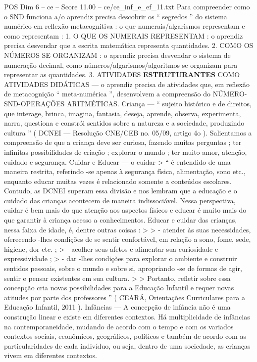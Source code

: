 \begin{textsample}{POS Dim 6 – ce – Score 11.00 – ce/ce\_inf\_e\_ef\_11.txt}
Para compreender como o SND funciona a/o aprendiz precisa descobrir os “ segredos ” do sistema numérico em reflexão metacognitiva : o que numerais/algarismos representam e como representam : 1.
O QUE OS NUMERAIS REPRESENTAM : o aprendiz precisa desvendar que a escrita matemática representa quantidades. 2.
COMO OS NÚMEROS SE ORGANIZAM : o aprendiz precisa desvendar o sistema de numeração decimal, como números/algarismos/algoritmos se organizam para representar as quantidades. 3.
ATIVIDADES \textbf{ESTRUTURANTES} COMO ATIVIDADES DIDÁTICAS — o aprendiz precisa de atividades que, em reflexão de metacognição “ meta-numérica ”, desenvolvem a compreensão do NÚMERO-SND-OPERAÇÕES ARITMÉTICAS.
Criança — “ sujeito histórico e de direitos, que interage, brinca, imagina, fantasia, deseja, aprende, observa, experimenta, narra, questiona e constrói sentidos sobre a natureza e a sociedade, produzindo cultura ” ( DCNEI — Resolução CNE/CEB no. 05/09, artigo 4o ).
Salientamos a compreensão de que a criança deve ser curiosa, fazendo muitas perguntas ; ter infinitas possibilidades de criação ; explorar o mundo ; ter muito amor, atenção, cuidado e segurança.
Cuidar e Educar — o cuidar > “ é entendido de uma maneira restrita, referindo -se apenas à segurança física, alimentação, sono etc., enquanto educar muitas vezes é relacionado somente a conteúdos escolares.
Contudo, as DCNEI superam essa divisão e nos lembram que a educação e o cuidado das crianças acontecem de maneira indissociável.
Nessa perspectiva, cuidar é bem mais do que atenção aos aspectos físicos e educar é muito mais do que garantir à criança acesso a conhecimentos.
Educar e cuidar das crianças, nessa faixa de idade, é, dentre outras coisas : > > - atender às suas necessidades, oferecendo -lhes condições de se sentir confortável, em relação a sono, fome, sede, higiene, dor etc. ; > - acolher seus afetos e alimentar sua curiosidade e expressividade ; > - dar -lhes condições para explorar o ambiente e construir sentidos pessoais, sobre o mundo e sobre si, apropriando -se de formas de agir, sentir e pensar existentes em sua cultura. > > Portanto, refletir sobre essa concepção cria novas possibilidades para a Educação Infantil e requer novas atitudes por parte dos professores ” ( CEARÁ, Orientações Curriculares para a Educação Infantil, 2011 ).
Infâncias — A concepção de infância não é uma construção linear e existe em diferentes contextos.
Há multiplicidade de infâncias na contemporaneidade, mudando de acordo com o tempo e com os variados contextos sociais, econômicos, geográficos, políticos e também de acordo com as particularidades de cada indivíduo, ou seja, dentro de uma sociedade, as crianças vivem em diferentes contextos.

\end{textsample}

